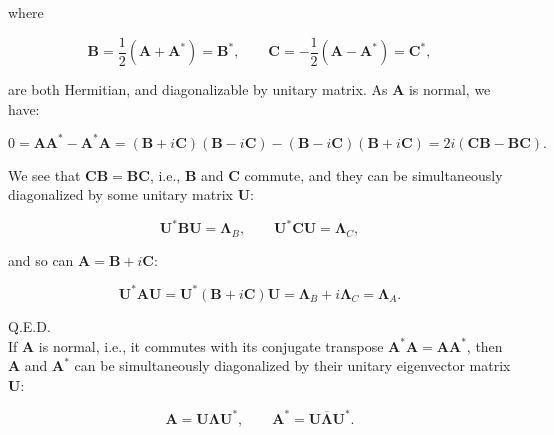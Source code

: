 \documentclass[10pt,b5paper,titlepage]{book}
\begin{document}
\begin{itemize}
        where

        \begin{equation}
            \mathbf{B} = \frac{1}{2}(\mathbf{A} + \mathbf{A}^{*}) = \mathbf{B}^{*}
            , \qquad
            \mathbf{C} = -\frac{1}{2}(\mathbf{A} - \mathbf{A}^{*}) = \mathbf{C}^{*}
        ,\end{equation}

        are both Hermitian, and diagonalizable by unitary matrix. As $\mathbf{A}$
        is normal, we have:

        \begin{equation}
            0 = \mathbf{A}\mathbf{A}^{*} - \mathbf{A}^{*}\mathbf{A}
            = (\mathbf{B} + i \mathbf{C})(\mathbf{B} - i \mathbf{C})
            - (\mathbf{B} - i \mathbf{C})(\mathbf{B} + i \mathbf{C})
            = 2 i (\mathbf{C}\mathbf{B} - \mathbf{B}\mathbf{C})
        .\end{equation}

        We see that $\mathbf{C}\mathbf{B} = \mathbf{B}\mathbf{C}$, i.e.,
        $\mathbf{B}$ and $\mathbf{C}$ commute, and they can be simultaneously
        diagonalized by some unitary matrix $\mathbf{U}$:

        \begin{equation}
            \mathbf{U}^{*}\mathbf{B}\mathbf{U} = \mathbf{\Lambda}_{B}
            , \qquad
            \mathbf{U}^{*}\mathbf{C}\mathbf{U} = \mathbf{\Lambda}_{C}
        ,\end{equation}

        and so can $\mathbf{A} = \mathbf{B} + i \mathbf{C}$:

        \begin{equation}
            \mathbf{U}^{*}\mathbf{A}\mathbf{U}
            = \mathbf{U}^{*}(\mathbf{B} + i \mathbf{C})\mathbf{U}
            = \mathbf{\Lambda}_{B} + i \mathbf{\Lambda}_{C} = \mathbf{\Lambda}_{A}
        .\end{equation}
\end{itemize}

Q.E.D.\\

If $\mathbf{A}$ is normal, i.e., it commutes with its conjugate transpose
$\mathbf{A}^{*}\mathbf{A} = \mathbf{A}\mathbf{A}^{*}$, then $\mathbf{A}$
and $\mathbf{A}^{*}$ can be simultaneously diagonalized by their unitary eigenvector
matrix $\mathbf{U}$:

\begin{equation}
    \mathbf{A} = \mathbf{U}\mathbf{\Lambda}\mathbf{U}^{*}
    , \qquad
    \mathbf{A}^{*} = \mathbf{U}\overline{\mathbf{\Lambda}}\mathbf{U}^{*}
.\end{equation}
\end{document}
